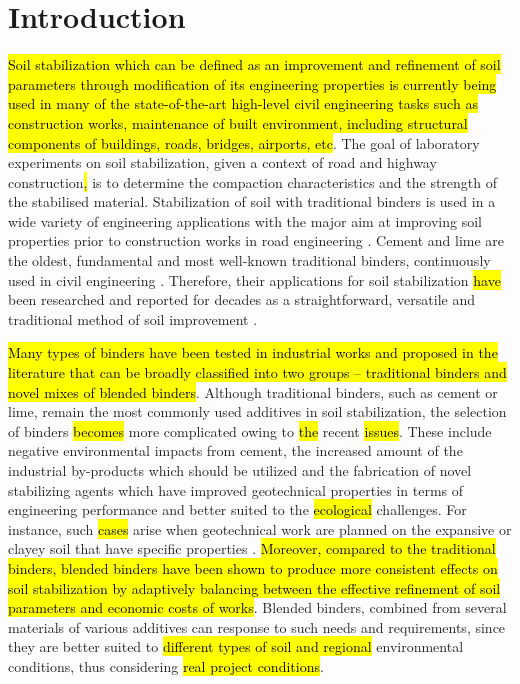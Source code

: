 \documentclass[materials,article,submit,pdftex,moreauthors]{Definitions/mdpi}
\begin{document}
\section{Introduction}

\hl{Soil stabilization which can be defined as an improvement and refinement of soil parameters through modification of its engineering properties is currently being used in many of the state-of-the-art high-level civil engineering tasks such as construction works, maintenance of built environment, including structural components of buildings, roads, bridges, airports, etc}. The goal of laboratory experiments on soil stabilization, given a context of road and highway construction\hl{, }is to determine the compaction characteristics and the strength of the stabilised material. Stabilization of soil with traditional binders is used in a wide variety of engineering applications with the major aim at improving soil properties prior to construction works in road engineering \citep{Park,Glossop,Kallenetal2016,Abdullah,Kallenetal2014,Sudhakar,Nordmark}. Cement and lime are the oldest, fundamental and most well-known traditional binders, continuously used in civil engineering\hl{ }\citep{Mitchell,Chen,Hilt,Kaniraj}. Therefore, their applications for soil stabilization \hl{have} been researched and reported for decades as a straightforward, versatile and traditional method of soil improvement \citep{Markwick,Abbey,Aldaood,Bell,Dahlinetal1999}. 

\hl{Many types of binders have been tested in industrial works and proposed in the literature that can be broadly classified into two groups -- traditional binders and novel mixes of blended binders}. Although traditional binders, such as cement or lime, remain the most commonly used additives in soil stabilization, the selection of binders \hl{becomes} more complicated owing to \hl{the} recent \hl{issues}. These include negative environmental impacts from cement, the increased amount of the industrial by-products which should be utilized and the fabrication of novel stabilizing agents which have improved geotechnical properties in terms of engineering performance and better suited to the \hl{ecological} challenges. For instance, such \hl{cases} arise when geotechnical work are planned on the expansive or clayey soil that have specific properties \cite{Nelson}. \hl{Moreover, compared to the traditional binders, blended binders have been shown to produce more consistent effects on soil stabilization by adaptively balancing between the effective refinement of soil parameters and economic costs of works}. Blended binders, combined from several materials of various additives can response to such needs and requirements, since they are better suited to \hl{different types of soil and regional} environmental conditions, thus considering \hl{real project conditions}.
\end{document}

